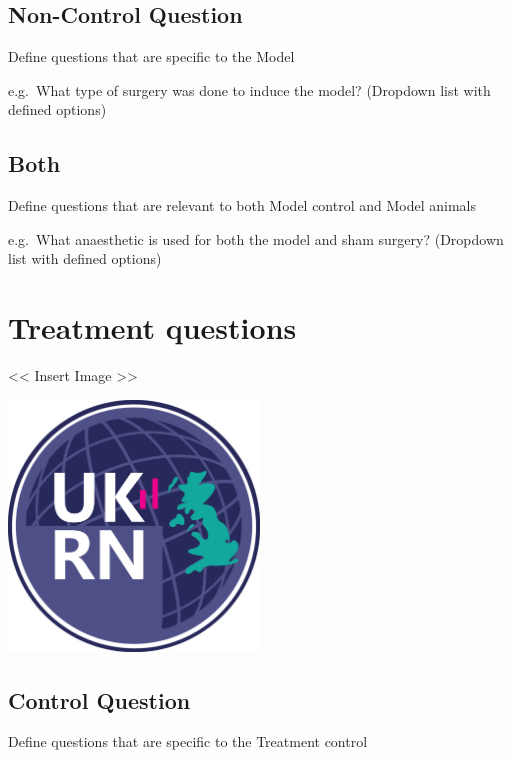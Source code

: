 \documentclass[
]{book}
\begin{document}
\hypertarget{non-control-question}{%
\subsection{Non-Control Question}\label{non-control-question}}

Define questions that are specific to the Model

e.g.~What type of surgery was done to induce the model?
(Dropdown list with defined options)

\hypertarget{both}{%
\subsection{Both}\label{both}}

Define questions that are relevant to both Model control and Model animals

e.g.~What anaesthetic is used for both the model and sham surgery?
(Dropdown list with defined options)

\hypertarget{treatment-questions}{%
\section{Treatment questions}\label{treatment-questions}}

\textless{}\textless{} Insert Image \textgreater{}\textgreater{}

\includegraphics[width=0.5\textwidth,height=0.5\textheight]{figs/evidence-triangle.png}

\hypertarget{control-question-1}{%
\subsection{Control Question}\label{control-question-1}}

Define questions that are specific to the Treatment control
\end{document}
